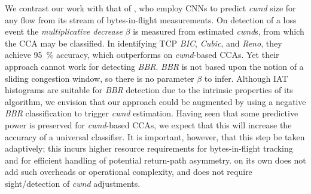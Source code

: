 We contrast our work with that of \textcite{DBLP:conf/icccn/HagosEYK18}, who employ CNNs to predict \emph{cwnd} size for any flow from its stream of bytes-in-flight measurements.
On detection of a loss event the \emph{multiplicative decrease} $\beta$ is measured from estimated \emph{cwnd}s, from which the CCA may be classified.
In identifying TCP \emph{BIC}, \emph{Cubic}, and \emph{Reno}, they achieve \SI{95}{\percent} accuracy, which outperforms \seidr{} on \emph{cwnd}-based CCAs.
Yet their approach cannot work for detecting \emph{BBR}. 
\emph{BBR} is not based upon the notion of a sliding congestion window, so there is no parameter $\beta$ to infer.
Although IAT histograms are suitable for \emph{BBR} detection due to the intrinsic properties of its algorithm, we envision that our approach could be augmented by using a negative \emph{BBR} classification to trigger \emph{cwnd} estimation.
Having seen that some predictive power is preserved for \emph{cwnd}-based CCAs, we expect that this will increase the accuracy of a universal classifier.
It is important, however, that this step be taken adaptively; this incurs higher resource requirements for bytes-in-flight tracking and for efficient handling of potential return-path asymmetry.
\seidr{} on its own does not add such overheads or operational complexity, and does not require sight/detection of \emph{cwnd} adjustments.

